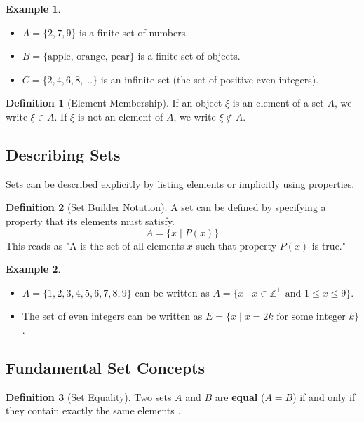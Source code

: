 \documentclass[12pt, a4paper]{article}
\theoremstyle{definition}
\newtheorem{definition}{Definition}[section]
\newtheorem{example}{Example}[section]
\theoremstyle{plain}
\theoremstyle{remark}
\begin{document}
\begin{example}
    \begin{itemize}
        \item $A = \{2, 7, 9\}$ is a finite set of numbers.
        \item $B = \{\text{apple, orange, pear}\}$ is a finite set of objects.
        \item $C = \{2, 4, 6, 8, ...\}$ is an infinite set (the set of positive even integers).
    \end{itemize}
\end{example}

\begin{definition}[Element Membership]
    If an object $\xi$ is an element of a set $A$, we write $\xi \in A$. If $\xi$ is not an element of $A$, we write $\xi \notin A$.
\end{definition}

\subsection{Describing Sets}

Sets can be described explicitly by listing elements or implicitly using properties.

\begin{definition}[Set Builder Notation]
    A set can be defined by specifying a property that its elements must satisfy.
    $$A = \{x \mid P(x)\}$$
    This reads as "A is the set of all elements $x$ such that property $P(x)$ is true."
\end{definition}

\begin{example}
    \begin{itemize}
        \item $A = \{1, 2, 3, 4, 5, 6, 7, 8, 9\}$ can be written as $A = \{x \mid x \in \mathbb{Z}^+ \text{ and } 1 \le x \le 9\}$.
        \item The set of even integers can be written as $E = \{x \mid x = 2k \text{ for some integer } k\}$.
    \end{itemize}
\end{example}

\subsection{Fundamental Set Concepts}

\begin{definition}[Set Equality]
    Two sets $A$ and $B$ are \textbf{equal} ($A = B$) if and only if they contain exactly the same elements \cite{faculty_set, ross}.
\end{definition}
\end{document}
